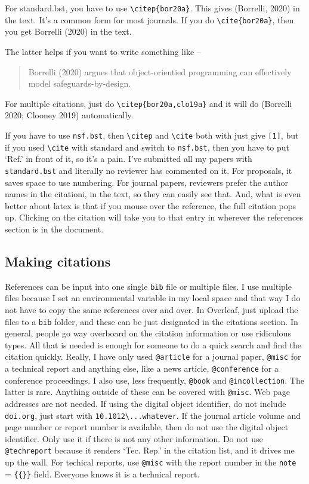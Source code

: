 \documentclass[11pt,a4paper]{article}
\begin{document}
For standard.bst, you have to use \verb=\citep{bor20a}=. This gives (Borrelli, 2020) in the text. It's a common form for most journals. If you do \verb=\cite{bor20a}=, then you get Borrelli (2020) in the text. 

The latter helps if you want to write something like -- 
\begin{quote}
    Borrelli (2020) argues that object-orientied programming can effectively model safeguards-by-design.
\end{quote}

For multiple citations, just do \verb=\citep{bor20a,clo19a}= and it will do (Borrelli 2020; Clooney 2019) automatically. 

If you have to use \verb=nsf.bst=, then \verb=\citep= and \verb=\cite= both with just give \texttt{[1]}, but if you used \verb=\cite= with standard and switch to \verb=nsf.bst=, then you have to put `Ref.' in front of it, so it's a pain. I've submitted all my papers with \verb=standard.bst= and literally no reviewer has commented on it. For proposals, it saves space to use numbering. For journal papers, reviewers prefer the author names in the citationi, in the text, so they can easily see that. And, what is even better about latex is that if you mouse over the reference, the full citation pops up. Clicking on the citation will take you to that entry in wherever the references section is in the document.

\subsection{Making citations}\label{sec-make-cite}
References can be input into one single \verb=bib= file or multiple files. I use multiple files because I set an environmental variable in my local space and that way I do not have to copy the same references over and over. In Overleaf, just upload the files to a \verb=bib= folder, and these can be just designated in the citations section. In general, people go way overboard on the citation information or use ridiculous types. All that is needed is enough for someone to do a quick search and find the citation quickly. Really, I have only used \verb=@article= for a journal paper, \verb=@misc= for a technical report and anything else, like a news article, \verb=@conference= for a conference proceedings. I also use, less frequently, \verb=@book= and \verb=@incollection=. The latter is rare. Anything outside of these can be covered with \verb=@misc=. Web page addresses are not needed. If using the digital object identifier, do not include \verb=doi.org=, just start with \verb=10.1012\...whatever=. If the journal article volume and page number or report number is available, then do not use the digital object identifier. Only use it if there is not any other information. Do not use \verb=@techreport= because it renders `Tec. Rep.' in the citation list, and it drives me up the wall. For techical reports, use \verb=@misc= with the report number in the \verb=note= = \verb={{}}= field. Everyone knows it is a technical report. 
\end{document}
